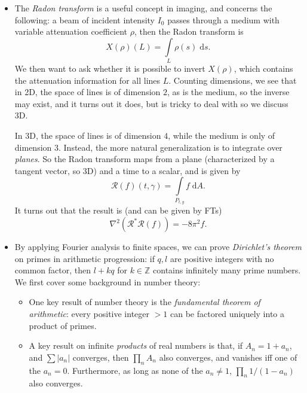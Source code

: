 \documentclass[11pt,
        usenames, %
        dvipsnames %
    ]{report}
\newcommand*{\abs}[1]{\left|#1\right|}
\newcommand*{\p}[1]{\left(#1\right)}
\begin{document}
\begin{itemize}
    \item The \emph{Radon transform} is a useful concept in imaging, and
        concerns the following: a beam of incident intensity $I_0$ passes
        through a medium with variable attenuation coefficient $\rho$, then the
        Radon transform is
        \begin{equation}
            X(\rho)(L) = \int\limits_L \rho(s) \;\mathrm{d}s.
        \end{equation}
        We then want to ask whether it is possible to invert $X(\rho)$, which
        contains the attenuation information for all lines $L$. Counting
        dimensions, we see that in 2D, the space of lines is of dimension $2$,
        as is the medium, so the inverse may exist, and it turns out it does,
        but is tricky to deal with so we discuss 3D.

        In 3D, the space of lines is of dimension $4$, while the medium is only
        of dimension $3$. Instead, the more natural generalization is to
        integrate over \emph{planes}. So the Radon transform maps from a plane
        (characterized by a tangent vector, so 3D) and a time to a scalar, and
        is given by
        \begin{equation}
            \mathcal{R}(f)(t, \gamma) = \int\limits_{P_{t, y}}
                f\;\mathrm{d}A.
        \end{equation}
        It turns out that the result is (and can be given by FTs)
        \begin{equation}
            \nabla^2\p{\mathcal{R}^* \mathcal{R}(f)}
                = -8\pi^2 f.
        \end{equation}

    \item By applying Fourier analysis to finite spaces, we can prove
        \emph{Dirichlet's theorem} on primes in arithmetic progression: if $q,
        l$ are positive integers with no common factor, then $l + kq$ for $k \in
        \mathbb{Z}$ contains infinitely many prime numbers. We first cover some
        background in number theory:
        \begin{itemize}
            \item One key result of number theory is the \emph{fundamental
                theorem of arithmetic}: every positive integer $> 1$ can be
                factored uniquely into a product of primes.

            \item A key result on infinite \emph{products} of real numbers is
                that, if $A_n = 1 + a_n$, and $\sum\limits \abs{a_n}$ converges,
                then $\prod_n A_n$ also converges, and vanishes iff one of the
                $a_n = 0$. Furthermore, as long as none of the $a_n \neq 1$,
                $\prod_n 1/(1 - a_n)$ also converges.


\end{itemize}
\end{itemize}
\end{document}
